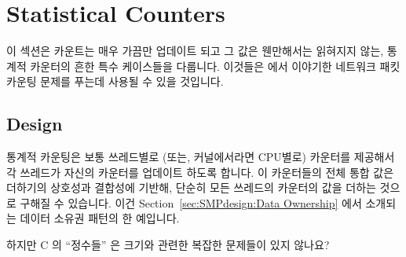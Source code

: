 \section{Statistical Counters}
\label{sec:count:Statistical Counters}

이 섹션은 카운트는 매우 가끔만 업데이트 되고 그 값은 웬만해서는 읽혀지지 않는,
통계적 카운터의 흔한 특수 케이스들을 다룹니다.
이것들은 {\QcountQstatcnt} 에서 이야기한 네트워크 패킷 카운팅 문제를 푸는데 사용될
수 있을 것입니다.

\subsection{Design}

통계적 카운팅은 보통 쓰레드별로 (또는, 커널에서라면 CPU별로) 카운터를 제공해서
각 쓰레드가 자신의 카운터를 업데이트 하도록 합니다.
이 카운터들의 전체 통합 값은 더하기의 상호성과 결합성에 기반해, 단순히 모든
쓰레드의 카운터의 값을 더하는 것으로 구해질 수 있습니다.
이건 Section~\ref{sec:SMPdesign:Data Ownership} 에서 소개되는 데이터 소유권
패턴의 한 예입니다.

\QuickQuiz{}
	하지만 C 의 ``정수들'' 은 크기와 관련한 복잡한 문제들이 있지 않나요?
	\iffalse

